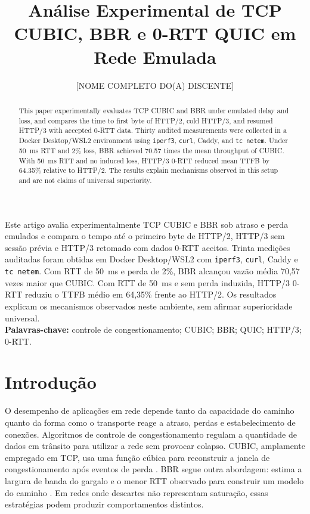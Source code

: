 \documentclass[12pt]{article}
\title{Análise Experimental de TCP CUBIC, BBR e 0-RTT QUIC em Rede Emulada}
\author{[NOME COMPLETO DO(A) DISCENTE]\inst{1}}
\begin{document}
\maketitle

\begin{abstract}
This paper experimentally evaluates TCP CUBIC and BBR under emulated delay and loss, and compares the time to first byte of HTTP/2, cold HTTP/3, and resumed HTTP/3 with accepted 0-RTT data. Thirty audited measurements were collected in a Docker Desktop/WSL2 environment using \texttt{iperf3}, \texttt{curl}, Caddy, and \texttt{tc netem}. Under 50~ms RTT and 2\% loss, BBR achieved 70.57 times the mean throughput of CUBIC. With 50~ms RTT and no induced loss, HTTP/3 0-RTT reduced mean TTFB by 64.35\% relative to HTTP/2. The results explain mechanisms observed in this setup and are not claims of universal superiority.
\end{abstract}

\begin{resumo}
Este artigo avalia experimentalmente TCP CUBIC e BBR sob atraso e perda emulados e compara o tempo até o primeiro byte de HTTP/2, HTTP/3 sem sessão prévia e HTTP/3 retomado com dados 0-RTT aceitos. Trinta medições auditadas foram obtidas em Docker Desktop/WSL2 com \texttt{iperf3}, \texttt{curl}, Caddy e \texttt{tc netem}. Com RTT de 50~ms e perda de 2\%, BBR alcançou vazão média 70,57 vezes maior que CUBIC. Com RTT de 50~ms e sem perda induzida, HTTP/3 0-RTT reduziu o TTFB médio em 64,35\% frente ao HTTP/2. Os resultados explicam os mecanismos observados neste ambiente, sem afirmar superioridade universal.\\
\textbf{Palavras-chave:} controle de congestionamento; CUBIC; BBR; QUIC; HTTP/3; 0-RTT.
\end{resumo}

\section{Introdução}

O desempenho de aplicações em rede depende tanto da capacidade do caminho quanto da forma como o transporte reage a atraso, perdas e estabelecimento de conexões. Algoritmos de controle de congestionamento regulam a quantidade de dados em trânsito para utilizar a rede sem provocar colapso. CUBIC, amplamente empregado em TCP, usa uma função cúbica para reconstruir a janela de congestionamento após eventos de perda \cite{rfc9438}. BBR segue outra abordagem: estima a largura de banda do gargalo e o menor RTT observado para construir um modelo do caminho \cite{cardwell2016bbr}. Em redes onde descartes não representam saturação, essas estratégias podem produzir comportamentos distintos.
\end{document}
